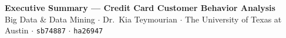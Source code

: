 \documentclass[9pt, letterpaper]{article}
\begin{document}
\thispagestyle{empty}

\begin{mdframed}[backgroundcolor=burnt, linewidth=0pt,
  innertopmargin=7pt, innerbottommargin=7pt,
  innerleftmargin=10pt, innerrightmargin=10pt]
  {\normalsize\bfseries\color{white} Executive Summary --- Credit Card Customer Behavior Analysis}\\[1pt]
  {\footnotesize\color{white!85}
    Big Data \& Data Mining $\cdot$ Dr.\ Kia Teymourian $\cdot$
    The University of Texas at Austin $\cdot$
    \texttt{sb74887} $\cdot$ \texttt{ha26947}}
\end{mdframed}

\vspace{3pt}

\end{document}
